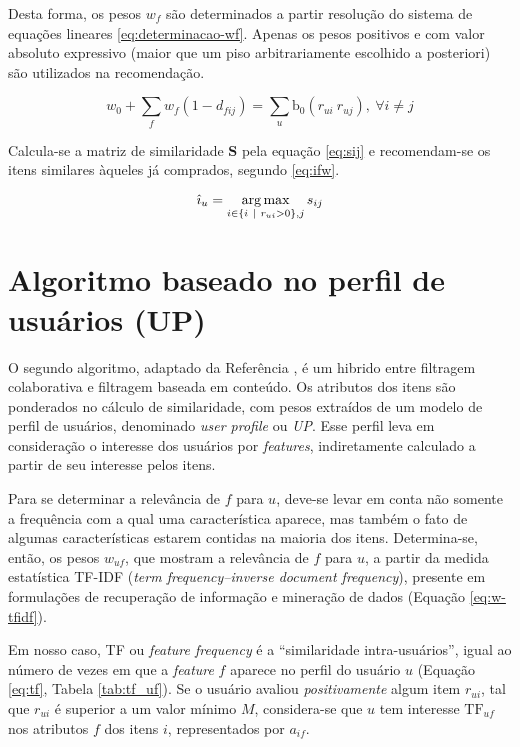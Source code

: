 Desta forma, os pesos $w_f$ são determinados a partir resolução do sistema de equações lineares \ref{eq:determinacao-wf}. Apenas os pesos positivos e com valor absoluto expressivo (maior que um piso arbitrariamente escolhido a posteriori) são utilizados na recomendação. 

\begin{equation}
\label{eq:determinacao-wf} 
    w_0 + \sum_{f}{w_{f}  \left(1-d_{fij}\right)} = \sum_{u}{\mathrm{b_0}\left(r_{ui} ~ r_{uj}\right)},~\forall i \neq j 
\end{equation} 

Calcula-se a matriz de similaridade $\mathbf{S}$ pela equação \ref{eq:sij} e recomendam-se os itens similares àqueles já comprados, segundo \ref{eq:ifw}.

\begin{equation}
\label{eq:ifw} 
    \hat{\imath}_u = \operatorname*{arg\,max}_{i \in \left\{i~|~r_{ui} > 0\right\}, j}{s_{ij}}
\end{equation} 



\section{Algoritmo baseado no perfil de usuários (UP)} %
\label{sec:algoritmo_baseado_no_perfil_de_usu_rios_}


O segundo algoritmo, adaptado da Referência , é um hibrido entre filtragem colaborativa e filtragem baseada em conteúdo. Os atributos dos itens são ponderados no cálculo de similaridade, com pesos extraídos de um modelo de perfil de usuários, denominado \textit{user profile} ou \textit{UP}. Esse perfil leva em consideração o interesse dos usuários por \textit{features}, indiretamente calculado a partir de seu interesse pelos itens. 

Para se determinar a relevância de $f$ para $u$, deve-se levar em conta não somente a frequência com a qual uma característica aparece, mas também o fato de algumas características estarem contidas na maioria dos itens. Determina-se, então, os pesos $w_{uf}$, que mostram a relevância de $f$ para $u$, a partir da medida estatística TF-IDF (\textit{term frequency--inverse document frequency}), presente em formulações de recuperação de informação e mineração de dados (Equação \ref{eq:w-tfidf}). 

Em nosso caso, TF ou \textit{feature frequency} é a ``similaridade intra-usuários'', igual ao número de vezes em que a \textit{feature} $f$ aparece no perfil do usuário $u$ (Equação \ref{eq:tf}, Tabela \ref{tab:tf_uf}). Se o usuário avaliou \textit{positivamente} algum item $r_{ui}$, tal que $r_{ui}$ é superior a um valor mínimo $M$, considera-se que $u$ tem interesse $\mathrm{TF}_{uf}$ nos atributos $f$ dos itens $i$, representados por $a_{if}$. 

